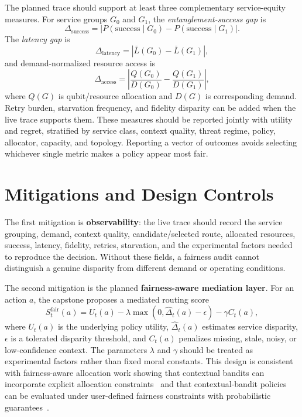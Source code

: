 \documentclass[conference]{IEEEtran}
\begin{document}
The planned trace should support at least three complementary service-equity measures. For service groups $G_0$ and $G_1$, the \emph{entanglement-success gap} is
\begin{equation}
\Delta_{\mathrm{success}}=
\left|P(\mathrm{success}\mid G_0)-P(\mathrm{success}\mid G_1)\right|.
\end{equation}
The \emph{latency gap} is
\begin{equation}
\Delta_{\mathrm{latency}}=
\left|\bar L(G_0)-\bar L(G_1)\right|,
\end{equation}
and demand-normalized resource access is
\begin{equation}
\Delta_{\mathrm{access}}=
\left|\frac{Q(G_0)}{D(G_0)}-\frac{Q(G_1)}{D(G_1)}\right|,
\end{equation}
where $Q(G)$ is qubit/resource allocation and $D(G)$ is corresponding demand. Retry burden, starvation frequency, and fidelity disparity can be added when the live trace supports them. These measures should be reported jointly with utility and regret, stratified by service class, context quality, threat regime, policy, allocator, capacity, and topology. Reporting a vector of outcomes avoids selecting whichever single metric makes a policy appear most fair.

\section{Mitigations and Design Controls}

The first mitigation is \textbf{observability}: the live trace should record the service grouping, demand, context quality, candidate/selected route, allocated resources, success, latency, fidelity, retries, starvation, and the experimental factors needed to reproduce the decision. Without these fields, a fairness audit cannot distinguish a genuine disparity from different demand or operating conditions.

The second mitigation is the planned \textbf{fairness-aware mediation layer}. For an action $a$, the capstone proposes a mediated routing score
\begin{equation}
S_t^{\mathrm{fair}}(a)=U_t(a)
-\lambda\max\!\left(0,\widehat{\Delta}_t(a)-\epsilon\right)
-\gamma C_t(a),
\end{equation}
where $U_t(a)$ is the underlying policy utility, $\widehat{\Delta}_t(a)$ estimates service disparity, $\epsilon$ is a tolerated disparity threshold, and $C_t(a)$ penalizes missing, stale, noisy, or low-confidence context. The parameters $\lambda$ and $\gamma$ should be treated as experimental factors rather than fixed moral constants. This design is consistent with fairness-aware allocation work showing that contextual bandits can incorporate explicit allocation constraints~\cite{chen2020faircmab} and that contextual-bandit policies can be evaluated under user-defined fairness constraints with probabilistic guarantees~\cite{metevier2019robinhood}.
\end{document}
